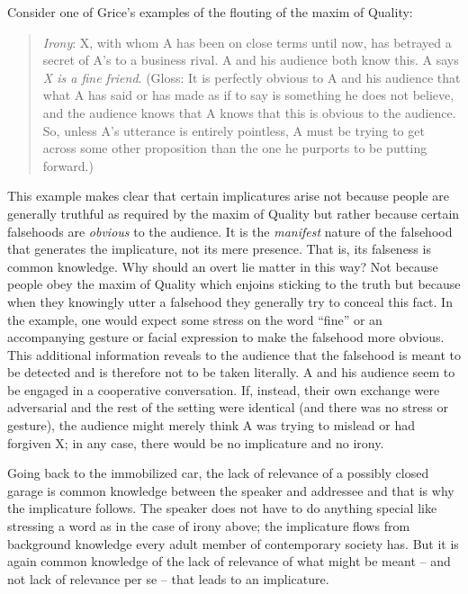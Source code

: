 Consider one of Grice's examples of the flouting of the maxim of Quality:

\begin{quote}

\emph{Irony}: X, with whom A has been on close terms until now, has betrayed a secret of A's to a business rival. A and his audience both know this. A says \emph{X is a fine friend}. (Gloss: It is perfectly obvious to A and his audience that what A has said or has made as if to say is something he does not believe, and the audience knows that A knows that this is obvious to the audience. So, unless A's utterance is entirely pointless, A must be trying to get across some other proposition than the one he purports to be putting forward.) \citep[34]{grice:landc}

\end{quote}\largerpage[-1]

\noindent This example makes clear that certain implicatures arise not because people are generally truthful as required by the maxim of Quality but rather because certain falsehoods are \emph{obvious} to the audience. It is the \emph{manifest} nature of the falsehood that generates the implicature, not its mere presence. That is, its falseness is common knowledge. Why should an overt lie matter in this way? Not because people obey the maxim of Quality which enjoins sticking to the truth but because when they knowingly utter a falsehood they generally try to conceal this fact. In the example, one would expect some stress on the word ``fine'' or an accompanying gesture or facial expression to make the falsehood more obvious. This additional information reveals to the audience that the falsehood is meant to be detected and is therefore not to be taken literally. A and his audience seem to be engaged in a cooperative conversation. If, instead, their own exchange were adversarial and the rest of the setting were identical (and there was no stress or gesture), the audience might merely think A was trying to mislead or had forgiven X; in any case, there would be no implicature and no irony.  

Going back to the immobilized car, the lack of relevance of a possibly closed garage  is common knowledge between the speaker and addressee and that is why the implicature follows. The speaker does not have to do anything special like stressing a word as in the case of irony above; the implicature flows from background knowledge every adult member of contemporary society has. But it is again common knowledge of the lack of relevance of what might be meant -- and not lack of relevance per se -- that leads to an implicature.

